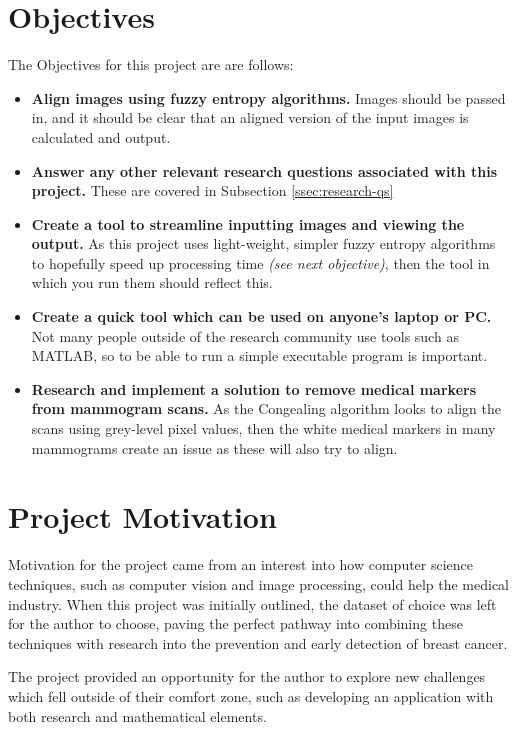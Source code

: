 \section{Objectives}
\label{sec:objectives}

The Objectives for this project are are follows:

\begin{itemize}
  \item \textbf{Align images using fuzzy entropy algorithms.} Images should be passed in, and it should be clear that an aligned version of the input images is calculated and output.
  \item \textbf{Answer any other relevant research questions associated with this project.} These are covered in Subsection \ref{ssec:research-qs}
  \item \textbf{Create a tool to streamline inputting images and viewing the output.} As this project uses light-weight, simpler fuzzy entropy algorithms to hopefully speed up processing time \textit{(see next objective)}, then the tool in which you run them should reflect this.
  \item \textbf{Create a quick tool which can be used on anyone's laptop or PC.} Not many people outside of the research community use tools such as MATLAB, so to be able to run a simple executable program is important.
  \item \textbf{Research and implement a solution to remove medical markers from mammogram scans.} As the \Gls{Congealing} algorithm looks to align the scans using grey-level pixel values, then the white medical markers in many mammograms create an issue as these will also try to align.
\end{itemize}

\section{Project Motivation}

Motivation for the project came from an interest into how computer science techniques, such as computer vision and image processing, could help the medical industry. When this project was initially outlined, the dataset of choice was left for the author to choose, paving the perfect pathway into combining these techniques with research into the prevention and early detection of breast cancer.

The project provided an opportunity for the author to explore new challenges which fell outside of their comfort zone, such as developing an application with both research and mathematical elements.
